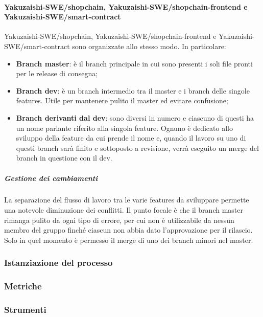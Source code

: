 \paragraph{Yakuzaishi-SWE/shopchain, Yakuzaishi-SWE/shopchain-frontend e
    \\ Yakuzaishi-SWE/smart-contract}
Yakuzaishi-SWE/shopchain, Yakuzaishi-SWE/shopchain-frontend{} e Yakuzaishi-SWE/smart-contract{} sono organizzate allo stesso modo. In particolare:
\begin{itemize}
    \item \textbf{Branch\glo{} master}: è il branch\glo{} principale in cui sono presenti i soli file pronti per le release di consegna;
    \item \textbf{Branch\glo{} dev}: è un branch\glo{} intermedio tra il master e i branch\glo{} delle singole features. Utile per mantenere pulito il master ed evitare confusione;
    \item \textbf{Branch\glo{} derivanti dal dev}: sono diversi in numero e ciascuno di questi ha un nome parlante riferito alla singola feature. Ognuno è dedicato allo sviluppo della feature da cui prende il nome e, quando il lavoro su uno di questi branch\glo{} sarà finito e sottoposto a revisione, verrà eseguito un merge\glo{} del branch\glo{} in questione con il dev.
\end{itemize}

\subparagraph{Gestione dei cambiamenti}
La separazione del flusso di lavoro tra le varie features da sviluppare permette una notevole diminuzione dei conflitti. Il punto focale è che il branch\glo{} master rimanga pulito da ogni tipo di errore, per cui non è utilizzabile da nessun membro del gruppo finché ciascun \roleProjectManagerLow{} non abbia dato l'approvazione per il rilascio. Solo in quel momento è permesso il merge\glo{} di uno dei branch\glo{} minori nel master.
\subsubsection{Istanziazione del processo}
\subsubsection{Metriche}
\subsubsection{Strumenti}
\vspace{2cm}

